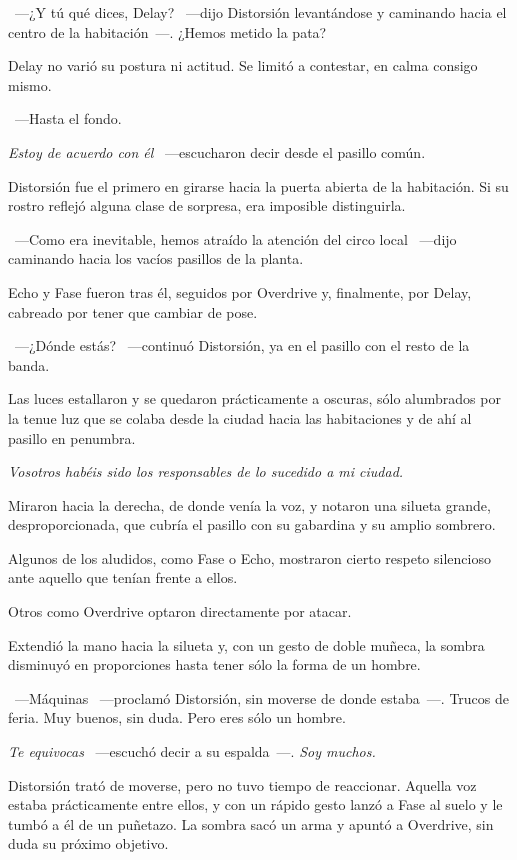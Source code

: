 ~---¿Y tú qué dices, Delay? ~---dijo Distorsión levantándose y caminando hacia el centro de la habitación~---. ¿Hemos metido la pata?

Delay no varió su postura ni actitud. Se limitó a contestar, en calma consigo mismo.

~---Hasta el fondo.

\emph{Estoy de acuerdo con él} ~---escucharon decir desde el pasillo común.

Distorsión fue el primero en girarse hacia la puerta abierta de la habitación. Si su rostro reflejó alguna clase de sorpresa, era imposible distinguirla.

~---Como era inevitable, hemos atraído la atención del circo local ~---dijo caminando hacia los vacíos pasillos de la planta.

Echo y Fase fueron tras él, seguidos por Overdrive y, finalmente, por Delay, cabreado por tener que cambiar de pose.

~---¿Dónde estás? ~---continuó Distorsión, ya en el pasillo con el resto de la banda.

Las luces estallaron y se quedaron prácticamente a oscuras, sólo alumbrados por la tenue luz que se colaba desde la ciudad hacia las habitaciones y de ahí al pasillo en penumbra.

\emph{Vosotros habéis sido los responsables de lo sucedido a mi ciudad.}

Miraron hacia la derecha, de donde venía la voz, y notaron una silueta grande, desproporcionada, que cubría el pasillo con su gabardina y su amplio sombrero.

Algunos de los aludidos, como Fase o Echo, mostraron cierto respeto silencioso ante aquello que tenían frente a ellos.

Otros como Overdrive optaron directamente por atacar.

Extendió la mano hacia la silueta y, con un gesto de doble muñeca, la sombra disminuyó en proporciones hasta tener sólo la forma de un hombre.

~---Máquinas ~---proclamó Distorsión, sin moverse de donde estaba~---. Trucos de feria. Muy buenos, sin duda. Pero eres sólo un hombre.

\emph{Te equivocas} ~---escuchó decir a su espalda~---. \emph{Soy muchos.}

Distorsión trató de moverse, pero no tuvo tiempo de reaccionar. Aquella voz estaba prácticamente entre ellos, y con un rápido gesto lanzó a Fase al suelo y le tumbó a él de un puñetazo. La sombra sacó un arma y apuntó a Overdrive, sin duda su próximo objetivo.

